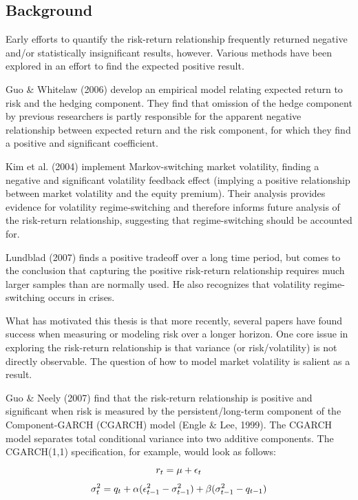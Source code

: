\documentclass[12pt]{article}
\begin{document}
\subsection{Background}
Early efforts to quantify the risk-return relationship frequently returned negative and/or statistically insignificant results, however. Various methods have been explored in an effort to find the expected positive result.\par
Guo \& Whitelaw (2006) develop an empirical model relating expected return to risk and the hedging component. They find that omission of the hedge component by previous researchers is partly responsible for the apparent negative relationship between expected return and the risk component, for which they find a positive 
and significant coefficient.\par
Kim et al. (2004) implement Markov-switching market volatility, finding a negative and significant volatility feedback effect (implying a positive relationship between market volatility and the equity premium). Their analysis provides evidence for volatility regime-switching and therefore informs future analysis of the risk-return relationship, suggesting that regime-switching should be accounted for.\par
Lundblad (2007) finds a positive tradeoff over a long time period, but comes to the conclusion that capturing the positive risk-return relationship requires much larger samples than are normally used. He also recognizes that volatility regime-switching occurs in crises.\par
What has motivated this thesis is that more recently, several papers have found success when measuring or modeling risk over a longer horizon. One core issue in exploring the risk-return relationship is that variance (or risk/volatility) is not directly observable. The question of how to model market volatility is salient as a result.\par
Guo \& Neely (2007) find that the risk-return relationship is positive and significant when risk is measured by the persistent/long-term component of the Component-GARCH (CGARCH) model (Engle \& Lee, 1999). The CGARCH model separates total conditional variance into two additive components. The CGARCH(1,1) specification, for example, would look as follows:
\begin{equation}
\nonumber
r_t=\mu+\epsilon_t\\
\end{equation}
\begin{equation}
\nonumber
\sigma_t^2=q_t+\alpha(\epsilon_{t-1}^2-\sigma_{t-1}^2)+\beta(\sigma_{t-1}^2-q_{t-1})\\
\end{equation}
\end{document}
